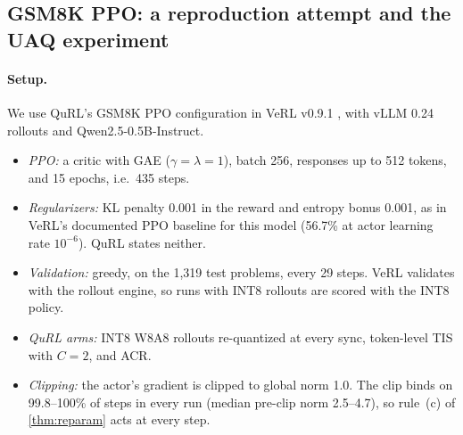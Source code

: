 \subsection{GSM8K PPO: a reproduction attempt and the UAQ experiment}\label{sec:s3}

\paragraph{Setup.} We use QuRL's GSM8K PPO configuration in VeRL v0.9.1 \citep{sheng2025hybridflow}, with vLLM 0.24 rollouts and Qwen2.5-0.5B-Instruct.
\begin{itemize}[leftmargin=*,itemsep=1pt]
\item \emph{PPO:} a critic with GAE ($\gamma=\lambda=1$), batch 256, responses up to 512 tokens, and 15 epochs, i.e.\ 435 steps.
\item \emph{Regularizers:} KL penalty 0.001 in the reward and entropy bonus 0.001, as in VeRL's documented PPO baseline for this model (56.7\% at actor learning rate $10^{-6}$). QuRL states neither.
\item \emph{Validation:} greedy, on the 1{,}319 test problems, every 29 steps. VeRL validates with the rollout engine, so runs with INT8 rollouts are scored with the INT8 policy.
\item \emph{QuRL arms:} INT8 W8A8 rollouts re-quantized at every sync, token-level TIS with $C=2$, and ACR.
\item \emph{Clipping:} the actor's gradient is clipped to global norm 1.0. The clip binds on 99.8--100\% of steps in every run (median pre-clip norm 2.5--4.7), so rule~(c) of \cref{thm:reparam} acts at every step.
\end{itemize}

